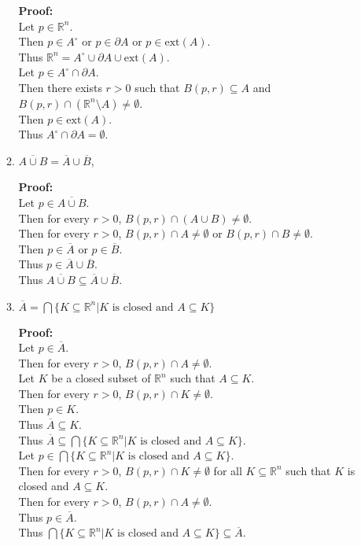 \documentclass{article}
\begin{document}
\begin{enumerate}
\begin{enumerate}
\textbf{Proof:} \\
Let $p \in \mathbb{R}^n$. \\
Then $p \in A^\circ$ or $p \in \partial A$ or $p \in \text{ext}(A)$. \\
Thus $\mathbb{R}^n = A^\circ \cup \partial A \cup \text{ext}(A)$.\\
Let $p \in A^\circ \cap \partial A$. \\
Then there exists $r > 0$ such that $B(p,r) \subseteq A$ and $B(p,r) \cap (\mathbb{R}^n \setminus A) \neq \emptyset$. \\
Then $p \in \text{ext}(A)$. \\
Thus $A^\circ \cap \partial A = \emptyset$.\\

    \item $\overline{A\cup B}=\overline A\cup \overline B$,  
    
\textbf{Proof:} \\
Let $p \in \overline{A\cup B}$. \\
Then for every $r > 0$, $B(p,r) \cap (A \cup B) \neq \emptyset$. \\
Then for every $r > 0$, $B(p,r) \cap A \neq \emptyset$ or $B(p,r) \cap B \neq \emptyset$. \\
Then $p \in \overline A$ or $p \in \overline B$. \\
Thus $p \in \overline A \cup \overline B$. \\
Thus $\overline{A\cup B} \subseteq \overline A \cup \overline B$.\\

    \item $\overline A=\bigcap \{K\subseteq \mathbb{R}^n |K \text{ is closed and } A\subseteq K\}$
    
\textbf{Proof:} \\
Let $p \in \overline A$. \\
Then for every $r > 0$, $B(p,r) \cap A \neq \emptyset$. \\
Let $K$ be a closed subset of $\mathbb{R}^n$ such that $A \subseteq K$. \\
Then for every $r > 0$, $B(p,r) \cap K \neq \emptyset$. \\
Then $p \in K$. \\
Thus $\overline A \subseteq K$. \\
Thus $\overline A \subseteq \bigcap \{K\subseteq \mathbb{R}^n |K \text{ is closed and } A\subseteq K\}$.\\
Let $p \in \bigcap \{K\subseteq \mathbb{R}^n |K \text{ is closed and } A\subseteq K\}$. \\
Then for every $r > 0$, $B(p,r) \cap K \neq \emptyset$ for all $K \subseteq \mathbb{R}^n$ such that $K$ is closed and $A \subseteq K$. \\
Then for every $r > 0$, $B(p,r) \cap A \neq \emptyset$. \\
Thus $p \in \overline A$. \\
Thus $\bigcap \{K\subseteq \mathbb{R}^n |K \text{ is closed and } A\subseteq K\} \subseteq \overline A$.\\


\end{enumerate}
\end{enumerate}
\end{document}
